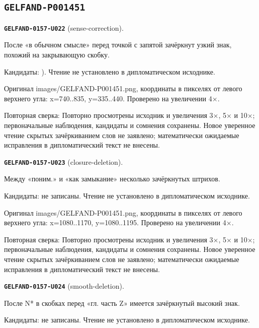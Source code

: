 \subsection*{\texttt{GELFAND-P001451}}
\par\noindent\leavevmode{}\label{GELFAND-0157-U022}\label{GELFAND-P001451:sense-correction}\textbf{\texttt{GELFAND-0157-U022}} (sense-correction).\nopagebreak[4]\par
После «в обычном смысле» перед точкой с запятой зачёркнут узкий знак, похожий на закрывающую скобку.\par
Кандидаты: ). Чтение не установлено в дипломатическом исходнике.\par
Оригинал images/GELFAND-P001451.png, координаты в пикселях от левого верхнего угла: x=740..835, y=335..440. Проверено на увеличении 4×.\par
Повторная сверка: Повторно просмотрены исходник и увеличения 3×, 5× и 10×; первоначальные наблюдения, кандидаты и сомнения сохранены. Новое уверенное чтение скрытых зачёркиванием слов не заявлено; математически ожидаемые исправления в дипломатический текст не внесены.\par\medskip
\par\noindent\leavevmode{}\label{GELFAND-0157-U023}\label{GELFAND-P001451:closure-deletion}\textbf{\texttt{GELFAND-0157-U023}} (closure-deletion).\nopagebreak[4]\par
Между «поним.» и «как замыкание» несколько зачёркнутых штрихов.\par
Кандидаты: не записаны. Чтение не установлено в дипломатическом исходнике.\par
Оригинал images/GELFAND-P001451.png, координаты в пикселях от левого верхнего угла: x=1080..1170, y=1080..1195. Проверено на увеличении 4×.\par
Повторная сверка: Повторно просмотрены исходник и увеличения 3×, 5× и 10×; первоначальные наблюдения, кандидаты и сомнения сохранены. Новое уверенное чтение скрытых зачёркиванием слов не заявлено; математически ожидаемые исправления в дипломатический текст не внесены.\par\medskip
\par\noindent\leavevmode{}\label{GELFAND-0157-U024}\label{GELFAND-P001451:smooth-deletion}\textbf{\texttt{GELFAND-0157-U024}} (smooth-deletion).\nopagebreak[4]\par
После N* в скобках перед «гл. часть Z» имеется зачёркнутый высокий знак.\par
Кандидаты: не записаны. Чтение не установлено в дипломатическом исходнике.\par
